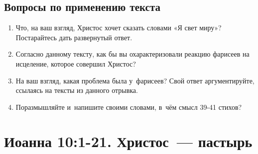 \documentclass[a4paper,12pt]{article}
\begin{document}
\subsection*{Вопросы по применению текста} 
\begin{enumerate}
    \item Что, на ваш взгляд, Христос хочет сказать словами «Я свет миру»? Постарайтесь дать развернутый ответ.
    
    \myline
    
    \myline
    \item Согласно данному тексту, как бы вы охарактеризовали реакцию фарисеев на исцеление, которое совершил Христос? 
    
    \myline
    
    \myline
    \item На ваш взгляд, какая проблема была у~фарисеев? Свой ответ аргументируйте, ссылаясь на тексты из данного отрывка. 
    
    \myline
    
    \myline
    \item Поразмышляйте и~напишите своими словами, в~чём смысл 39-41 стихов?
    
    \myline
    
    \myline
\end{enumerate}


\section{Иоанна 10:1-21. Христос~--- пастырь}
\end{document}
